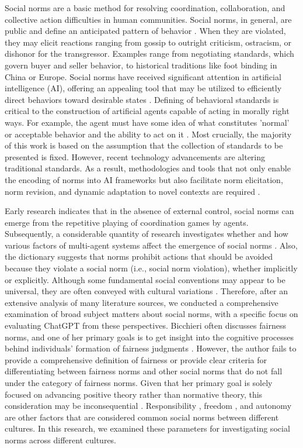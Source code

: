 \documentclass[sigconf]{acmart}
\begin{document}
Social norms are a basic method for resolving coordination, collaboration, and collective action difficulties in human communities. Social norms, in general, are public and define an anticipated pattern of behavior \cite{barta2021constructing}. When they are violated, they may elicit reactions ranging from gossip to outright criticism, ostracism, or dishonor for the transgressor. Examples range from negotiating standards, which govern buyer and seller behavior, to historical traditions like foot binding in China or Europe. Social norms have received significant attention in artificial intelligence (AI), offering an appealing tool that may be utilized to efficiently direct behaviors toward desirable states \cite{santos2018social}. Defining of behavioral standards is critical to the construction of artificial agents capable of acting in morally right ways. For example, the agent must have some idea of what constitutes 'normal' or acceptable behavior and the ability to act on it \cite{Broersen2001BOID}. Most crucially, the majority of this work is based on the assumption that the collection of standards to be presented is fixed. However, recent technology advancements are altering traditional standards. As a result, methodologies and tools that not only enable the encoding of norms into AI frameworks but also facilitate norm elicitation, norm revision, and dynamic adaptation to novel contexts are required \cite{Dignum2018Ethics}.


Early research indicates that in the absence of external control, social norms can emerge from the repetitive playing of coordination games by agents. Subsequently, a considerable quantity of research investigates whether and how various factors of multi-agent systems affect the emergence of social norms \cite{hu2018social}. Also, the dictionary suggests that norms prohibit actions that should be avoided because they violate a social norm (i.e., social norm violation), whether implicitly or explicitly. Although some fundamental social conventions may appear to be universal, they are often conveyed with cultural variations \cite{neuman2023ai}. Therefore, after an extensive analysis of many literature sources, we conducted a comprehensive examination of broad subject matters about social norms, with a specific focus on evaluating ChatGPT from these perspectives. Bicchieri often discusses fairness norms, and one of her primary goals is to get insight into the cognitive processes behind individuals' formation of fairness judgments \cite{cristina2006grammar}. However, the author fails to provide a comprehensive definition of fairness or provide clear criteria for differentiating between fairness norms and other social norms that do not fall under the category of fairness norms. Given that her primary goal is solely focused on advancing positive theory rather than normative theory, this consideration may be inconsequential \cite{hausman2008fairness}. Responsibility \cite{devos2001social, you2023impact}, freedom \cite{steen2016fear}, and autonomy \cite{roberts2014autonomy} are other factors that are considered common social norms between different cultures. In this research, we examined these parameters for investigating social norms across different cultures.
\end{document}
